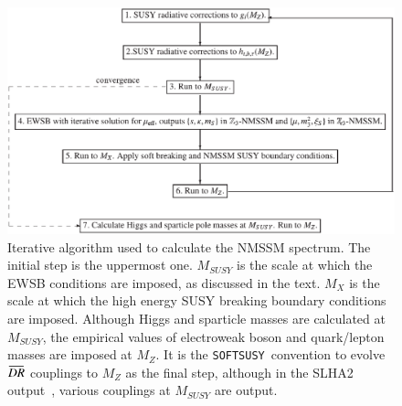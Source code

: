 \documentclass[final,3p,times]{elsarticle}
\def\SOFTSUSY{{\tt SOFTSUSY}}
\newcommand{\Zv}{\,\mathbf{\backslash}\mkern-11.0mu{\mathbb{Z}}_{3}} %
\newcommand{\overbar}[1]{\mkern 1.5mu\overline{\mkern-1.5mu#1\mkern-1.5mu}\mkern 1.5mu}
\begin{document}
\begin{figure}
\begin{center}
\includegraphics[width=350pt]{nmssmalg.eps}
\end{center}
\caption{Iterative algorithm used to calculate the NMSSM spectrum. 
The initial step is the
uppermost one. $M_{SUSY}$ is the scale at which the EWSB
conditions 
are imposed, as discussed in the text. $M_X$ is the scale at which the high
energy SUSY breaking boundary conditions are imposed. Although Higgs and
sparticle masses are calculated at $M_{SUSY}$, the empirical values of 
electroweak boson and quark/lepton masses are imposed at $M_Z$. It is the
\SOFTSUSY~convention to evolve $\overbar{DR}$ couplings to $M_Z$ as the final step,
although in the SLHA2 output~\cite{Allanach:2008qq}, various couplings at
$M_{SUSY}$ are output. 
\label{fig:algorithm}}
\end{figure}
\end{document}
